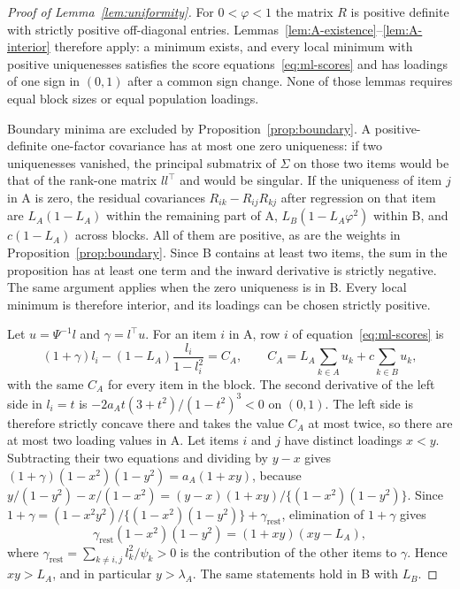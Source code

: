 \begin{proof}[Proof of Lemma~\ref{lem:uniformity}]
For $0<\varphi<1$ the matrix $R$ is positive definite with strictly positive off-diagonal entries. Lemmas~\ref{lem:A-existence}--\ref{lem:A-interior} therefore apply: a minimum exists, and every local minimum with positive uniquenesses satisfies the score equations~\eqref{eq:ml-scores} and has loadings of one sign in $(0,1)$ after a common sign change. None of those lemmas requires equal block sizes or equal population loadings.

Boundary minima are excluded by Proposition~\ref{prop:boundary}. A positive-definite one-factor covariance has at most one zero uniqueness: if two uniquenesses vanished, the principal submatrix of $\Sigma$ on those two items would be that of the rank-one matrix $ll^{\top}$ and would be singular. If the uniqueness of item $j$ in A is zero, the residual covariances $R_{ik}-R_{ij}R_{kj}$ after regression on that item are $L_A(1-L_A)$ within the remaining part of A, $L_B(1-L_A\varphi^2)$ within B, and $c(1-L_A)$ across blocks. All of them are positive, as are the weights in Proposition~\ref{prop:boundary}. Since B contains at least two items, the sum in the proposition has at least one term and the inward derivative is strictly negative. The same argument applies when the zero uniqueness is in B. Every local minimum is therefore interior, and its loadings can be chosen strictly positive.

Let $u=\Psi^{-1}l$ and $\gamma=l^{\top}u$. For an item $i$ in A, row $i$ of equation~\eqref{eq:ml-scores} is
\[
(1+\gamma)l_i-(1-L_A)\frac{l_i}{1-l_i^2}=C_A,
\qquad
C_A=L_A\sum_{k\in A}u_k+c\sum_{k\in B}u_k,
\]
with the same $C_A$ for every item in the block. The second derivative of the left side in $l_i=t$ is $-2a_At(3+t^2)/(1-t^2)^3<0$ on $(0,1)$. The left side is therefore strictly concave there and takes the value $C_A$ at most twice, so there are at most two loading values in A. Let items $i$ and $j$ have distinct loadings $x<y$. Subtracting their two equations and dividing by $y-x$ gives $(1+\gamma)(1-x^2)(1-y^2)=a_A(1+xy)$, because $y/(1-y^2)-x/(1-x^2)=(y-x)(1+xy)/\{(1-x^2)(1-y^2)\}$. Since $1+\gamma=(1-x^2y^2)/\{(1-x^2)(1-y^2)\}+\gamma_{\mathrm{rest}}$, elimination of $1+\gamma$ gives
\[
\gamma_{\mathrm{rest}}(1-x^2)(1-y^2)
=(1+xy)(xy-L_A),
\]
where $\gamma_{\mathrm{rest}}=\sum_{k\ne i,j}l_k^2/\psi_k>0$ is the contribution of the other items to $\gamma$. Hence $xy>L_A$, and in particular $y>\lambda_A$. The same statements hold in B with $L_B$.


\end{proof}
